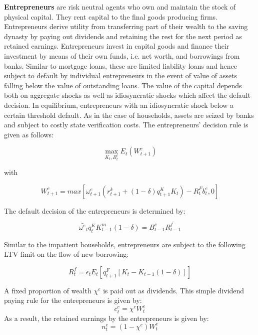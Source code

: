 \documentclass[12pt]{article}
\numberwithin{equation}{section}
\begin{document}
\noindent
\textbf{Entrepreneurs } are risk neutral agents who own and maintain the stock of physical capital. They rent  capital to the final goods producing firms. Entrepreneurs derive utility from transferring part of their wealth to the saving dynasty by paying out dividends and retaining the rest for the next period as retained earnings. Entrepreneurs invest in capital goods and finance their investment by means of their own funds, i.e. net worth, and borrowings from banks. Similar to mortgage loans, these are limited liability loans and hence subject to default by individual entrepreneurs in the event of value of assets falling below the value of outstanding loans. The value of the capital depends both on aggregate shocks  as well as idiosyncratic shocks which affect the default decision. In equilibrium, entrepreneurs with an idiosyncratic shock below a certain threshold default.  As in the case of households, assets are seized by banks and subject to costly state verification costs. The entrepreneurs' decision rule is given as follows: 

\begin{equation}
\max_{K_t,B^e_t}E_t(W^e_{t+1})
\end{equation}	

with

\begin{equation}
W^e_{t+1}=max[\omega^e_{t+1}(r^k_{t+1}+(1-\delta)q^K_{t+1}K_{t})-R^F_{t}b^e_{t},0]
\end{equation}


The default decision of the entrepreneurs is determined by: 

\begin{equation}
\bar{\omega^e}_t q^K_{t} K^m_{t-1}(1-\delta) = B^e_{t-1}R^f_{t-1}
\end{equation}

Similar to the impatient households, entrepreneurs are subject to the following LTV limit on the flow of new borrowing: 

\begin{equation}
[B^e_t-B^e_{t-1}(1-rp)]R^f_{t} =\epsilon_{t} E_t[q^F_{t+1} [K_t-K_{t-1}(1-\delta)]]
\end{equation}


A fixed proportion of wealth $\chi^e$ is paid out as dividends. This simple dividend paying rule for the entrepreneurs is given by:
\begin{equation}
c^e_t=\chi^e W^e_t
\end{equation}
As a result, the retained earnings by the entrepreneurs is given by:
\begin{equation}
n^e_t=(1-\chi^e) W^e_t
\end{equation}
\end{document}
